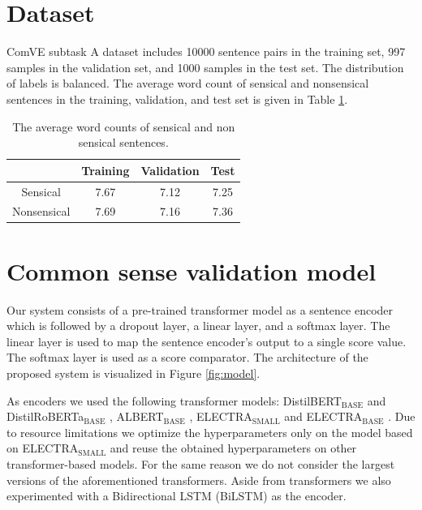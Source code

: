 \documentclass[10pt, a4paper]{article}
\begin{document}
\section{Dataset}
\label{data}
ComVE subtask A dataset includes 10000 sentence pairs in the training set, 997 samples in the validation set, and 1000 samples in the test set. The distribution of labels is balanced. The average word count of sensical and nonsensical sentences in the training, validation, and test set is given in Table \ref{lengths}.
\begin{table}[]
    \caption{The average word counts of sensical and non sensical sentences.}

    \begin{center}
    \begin{tabular}{cccc}
        \toprule
        & Training & Validation & Test\\
        \midrule
        Sensical & 7.67 & 7.12 & 7.25\\
        Nonsensical & 7.69 & 7.16 & 7.36 \\
        \bottomrule
    \end{tabular}
    
    \end{center}

    \label{lengths}
\end{table}

\section{Common sense validation model} 
\label{model}
Our system consists of a pre-trained transformer model as a sentence encoder which is followed by a dropout layer, a linear layer, and a softmax layer. The linear layer is used to map the sentence encoder's output to a single score value. The softmax layer is used as a score comparator. The architecture of the proposed system is visualized in Figure \ref{fig:model}.

As encoders we used the following transformer models: DistilBERT$_{\text{BASE}}$ and DistilRoBERTa$_{\text{BASE}}$ \citep{distil-bert}, ALBERT$_{\text{BASE}}$ \citep{albert}, ELECTRA$_{\text{SMALL}}$ and ELECTRA$_{\text{BASE}}$ \citep{electra}. Due to resource limitations we optimize the hyperparameters only on the model based on ELECTRA$_{\text{SMALL}}$ and reuse the obtained hyperparameters on other transformer-based models. For the same reason we do not consider the largest versions of the aforementioned transformers. Aside from transformers we also experimented with a Bidirectional LSTM (BiLSTM) \citep{schuster1997bilstm} as the encoder.
\end{document}
